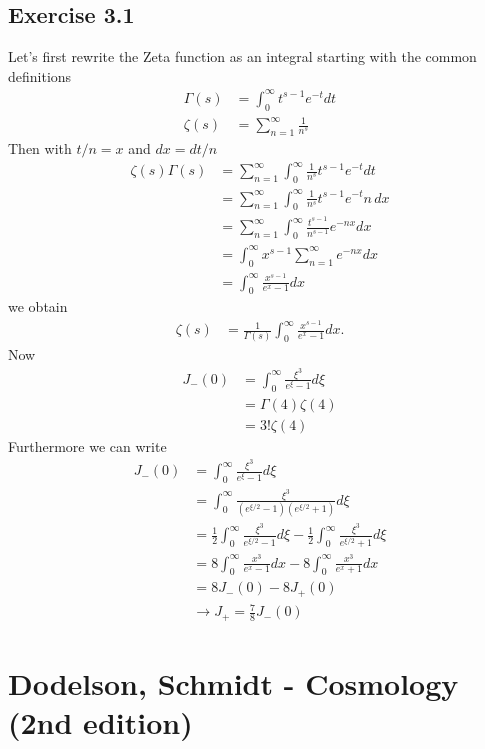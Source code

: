 \documentclass[10pt,a4paper]{book}
\theoremstyle{definition}
\begin{document}
\subsection{Exercise 3.1}
Let's first rewrite the Zeta function as an integral starting with the common definitions
\begin{align}
    \Gamma(s)&=\int_0^\infty t^{s-1}e^{-t} dt\\
    \zeta(s)&=\sum_{n=1}^\infty\frac{1}{n^s}
\end{align}
Then with $t/n=x$ and $dx=dt/n$
\begin{align}
	\zeta(s)\Gamma(s)
	&=\sum_{n=1}^\infty\int_0^\infty \frac{1}{n^s}t^{s-1}e^{-t} dt\\
	&=\sum_{n=1}^\infty\int_0^\infty \frac{1}{n^s}t^{s-1}e^{-t} n\,dx\\
	&=\sum_{n=1}^\infty\int_0^\infty \frac{t^{s-1}}{n^{s-1}}e^{-nx} dx\\
	&=\int_0^\infty x^{s-1}\sum_{n=1}^\infty e^{-nx} dx\\
	&=\int_0^\infty \frac{x^{s-1}}{e^{x}-1} dx
\end{align}
we obtain
\begin{align}
\zeta(s)&=\frac{1}{\Gamma(s)}\int_0^\infty \frac{x^{s-1}}{e^{x}-1} dx.
\end{align}
Now
\begin{align}
J_{-}(0)&=\int_0^\infty\frac{\xi^3}{e^\xi-1}d\xi\\
&=\Gamma(4)\zeta(4)\\
&=3!\zeta(4)
\end{align}
Furthermore we can write
\begin{align}
J_{-}(0)
&=\int_0^\infty\frac{\xi^3}{e^\xi-1}d\xi\\
&=\int_0^\infty\frac{\xi^3}{(e^{\xi/2}-1)(e^{\xi/2}+1)}d\xi\\
&=\frac{1}{2}\int_0^\infty\frac{\xi^3}{e^{\xi/2}-1}d\xi-\frac{1}{2}\int_0^\infty\frac{\xi^3}{e^{\xi/2}+1}d\xi\\
&=8\int_0^\infty\frac{x^3}{e^{x}-1}dx-8\int_0^\infty\frac{x^3}{e^{x}+1}dx\\
&=8J_{-}(0)-8J_{+}(0)\\
&\rightarrow J_{+}=\frac{7}{8}J_{-}(0)
\end{align}



\newpage
\section{{\sc Dodelson, Schmidt} - Cosmology (2nd edition)}
\end{document}
